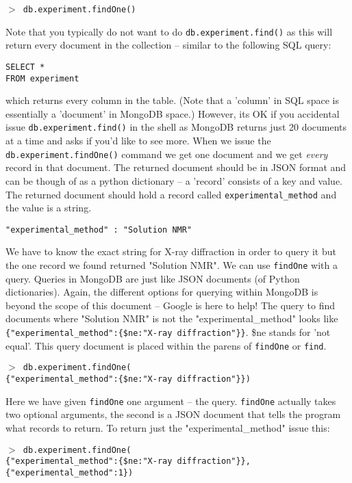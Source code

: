 \documentclass[12pt]{article}
\newcommand{\mdbcmdline}[1]{\vspace{5mm} \noindent
\texttt{$>$ #1}
\vspace{5mm}

}
\begin{document}
\mdbcmdline{db.experiment.findOne()}
\noindent
Note that you typically do not want to do \texttt{db.experiment.find()} as this will return every document in the collection -- similar to the following SQL query:

\vspace{5mm}
\noindent
\texttt{SELECT *\\
FROM experiment}

\vspace{5mm}
\noindent
which returns every column in the table. 
(Note that a 'column' in SQL space is essentially a 'document' in MongoDB space.)
However, its OK if you accidental issue \texttt{db.experiment.find()} in the shell as MongoDB returns just 20 documents at a time and asks if you'd like to see more.
When we issue the \texttt{db.experiment.findOne()} command we get one document and we get \textit{every} record in that document.
The returned document should be in JSON format and can be though of as a python dictionary -- a 'record' consists of a key and value.
The returned document should hold a record called \texttt{experimental\_method} and the value is a string.

\vspace{5mm}
\noindent
\texttt{"experimental\_method" : "Solution NMR"}

\vspace{5mm}
\noindent
We have to know the exact string for X-ray diffraction in order to query it but the one record we found returned "Solution NMR".
We can use \texttt{findOne} with a query.
Queries in MongoDB are just like JSON documents (of Python dictionaries).
Again, the different options for querying within MongoDB is beyond the scope of this document -- Google is here to help!
The query to find documents where "Solution NMR" is not the "experimental\_method" looks like \texttt{\{"experimental\_method":\{\$ne:"X-ray diffraction"\}\}}. \$ne stands for 'not equal'.
This query document is placed within the parens of \texttt{findOne} or \texttt{find}.

\mdbcmdline{db.experiment.findOne(\\
\{"experimental\_method":\{\$ne:"X-ray diffraction"\}\})}
\noindent
Here we have given \texttt{findOne} one argument -- the query. 
\texttt{findOne} actually takes two optional arguments, the second is a JSON document that tells the program what records to return.
To return just the "experimental\_method" issue this:

\mdbcmdline{db.experiment.findOne(\\
\{"experimental\_method":\{\$ne:"X-ray diffraction"\}\}, \\
\{"experimental\_method":1\})
}
\end{document}
